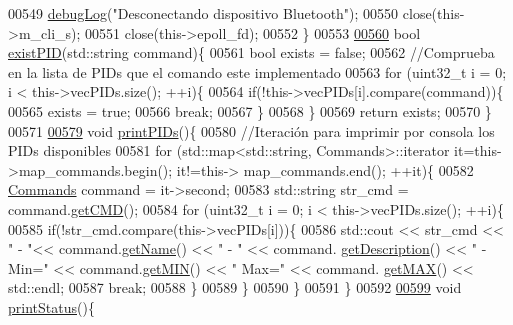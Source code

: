 \begin{DoxyCode}
{{{{{{{{{{{{{{00549         \hyperlink{debug_8hpp_a55f41cf7b0585224496de3d7adbc101c}{debugLog}(\textcolor{stringliteral}{"Desconectando dispositivo Bluetooth"});
00550         close(this->m\_cli\_s);
00551         close(this->epoll\_fd);
00552     \}
00553 
\hyperlink{classObd_aeff55ecb0a0a4278a22f20db3d2e17e3}{00560}     \textcolor{keywordtype}{bool} \hyperlink{classObd_aeff55ecb0a0a4278a22f20db3d2e17e3}{existPID}(std::string command)\{
00561         \textcolor{keywordtype}{bool} exists = \textcolor{keyword}{false};
00562         \textcolor{comment}{//Comprueba en la lista de PIDs que el comando este implementado}
00563         \textcolor{keywordflow}{for} (uint32\_t i = 0; i < this->vecPIDs.size(); ++i)\{
00564             \textcolor{keywordflow}{if}(!this->vecPIDs[i].compare(command))\{
00565                 exists = \textcolor{keyword}{true};
00566                 \textcolor{keywordflow}{break};
00567             \}
00568         \}
00569         \textcolor{keywordflow}{return} exists;
00570     \}
00571     
\hyperlink{classObd_abf7e84f45236ea1c78c762ac895c532c}{00579}     \textcolor{keywordtype}{void} \hyperlink{classObd_abf7e84f45236ea1c78c762ac895c532c}{printPIDs}()\{
00580         \textcolor{comment}{//Iteración para imprimir por consola los PIDs disponibles}
00581         \textcolor{keywordflow}{for} (std::map<std::string, Commands>::iterator it=this->map\_commands.begin(); it!=this->
      map\_commands.end(); ++it)\{
00582             \hyperlink{classCommands}{Commands} command = it->second;
00583             std::string str\_cmd = command.\hyperlink{classCommands_a9aee21ab91fdfc8e9daa59e1e8f20b73}{getCMD}();
00584             \textcolor{keywordflow}{for} (uint32\_t i = 0; i < this->vecPIDs.size(); ++i)\{
00585                 \textcolor{keywordflow}{if}(!str\_cmd.compare(this->vecPIDs[i]))\{
00586                     std::cout << str\_cmd << \textcolor{stringliteral}{" - "}<< command.\hyperlink{classCommands_adf3d8a96310b1f4e57a6ecf0f2f153ea}{getName}() << \textcolor{stringliteral}{" - "} << command.
      \hyperlink{classCommands_ad82fe7dfcf1908423bdb59d048020e26}{getDescription}() << \textcolor{stringliteral}{" - Min="} << command.\hyperlink{classCommands_af0a1e2ea65b5a57997c721a8d77a1013}{getMIN}() << \textcolor{stringliteral}{" Max="} << command.
      \hyperlink{classCommands_afbad1051313d0cdecba276384cb7fc6b}{getMAX}() << std::endl;
00587                     \textcolor{keywordflow}{break};
00588                 \}
00589             \}
00590         \}
00591     \}
00592 
\hyperlink{classObd_a0938bfdd6d05795e826a239cc0f29f32}{00599}     \textcolor{keywordtype}{void} \hyperlink{classObd_a0938bfdd6d05795e826a239cc0f29f32}{printStatus}()\{
}}}}}}}}}}}}}}
\end{DoxyCode}
